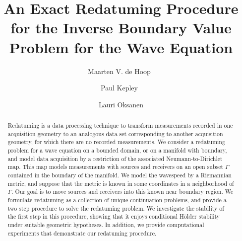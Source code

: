 \documentclass[final,leqno]{siamart1116}
\title{An Exact Redatuming Procedure for the Inverse Boundary Value Problem for the Wave Equation}
\author{Maarten V. de  Hoop\ \footnotemark[2]
\and Paul Kepley\ \footnotemark[3]
\and Lauri Oksanen \footnotemark[4]}
\begin{document}
\maketitle

 





\pagestyle{myheadings} 

\thispagestyle{plain} 


\begin{abstract}
Redatuming is a data processing technique to
transform measurements recorded in one acquisition geometry
to an analogous data set corresponding to another acquisition geometry, for which there are no recorded measurements. 
We consider a redatuming problem for a wave equation on a bounded domain, or on a manifold with boundary, 
and  model data acquisition by a restriction of the associated Neumann-to-Dirichlet map.
This map models measurements with 
sources and receivers on an open subset $\Gamma$
contained in the boundary of the manifold. We model the wavespeed by a Riemannian metric, and suppose that the
metric is known in some coordinates in a neighborhood of $\Gamma$.
Our goal is to move sources and receivers into this known near boundary
region. We formulate redatuming as a collection of unique
continuation problems, and provide a two step procedure to solve the
redatuming problem. We investigate the stability of the first step
in this procedure, showing that it enjoys conditional H\"older
stability under suitable geometric hypotheses. In addition, we
provide computational experiments that demonstrate our redatuming
procedure.
\end{abstract}
\end{document}
